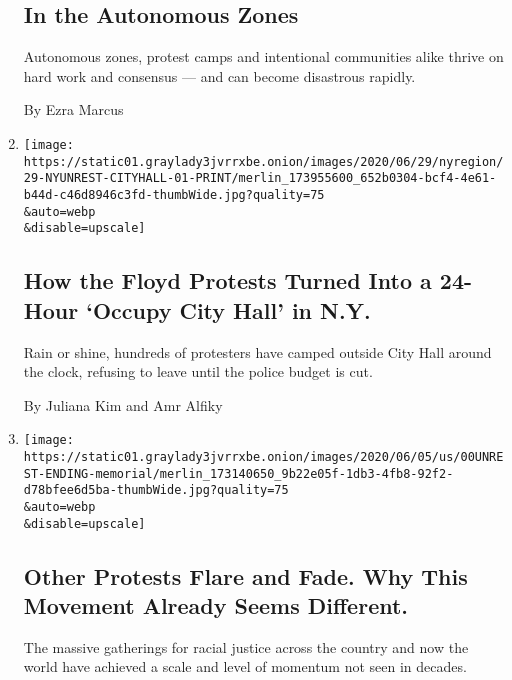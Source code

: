 \begin{enumerate}
  \hypertarget{in-the-autonomous-zones}{%
  \subsection{In the Autonomous Zones}\label{in-the-autonomous-zones}}

  Autonomous zones, protest camps and intentional communities alike
  thrive on hard work and consensus --- and can become disastrous
  rapidly.

  By Ezra Marcus
\item
  \href{/2020/06/28/nyregion/occupy-city-hall-nyc.html}{}

  \texttt{[image: https://static01.graylady3jvrrxbe.onion/images/2020/06/29/nyregion/29-NYUNREST-CITYHALL-01-PRINT/merlin\_173955600\_652b0304-bcf4-4e61-b44d-c46d8946c3fd-thumbWide.jpg?quality=75\\\&auto=webp\\\&disable=upscale]}

  \hypertarget{how-the-floyd-protests-turned-into-a-24-hour-occupy-city-hall-in-ny}{%
  \subsection{How the Floyd Protests Turned Into a 24-Hour `Occupy City
  Hall' in
  N.Y.}\label{how-the-floyd-protests-turned-into-a-24-hour-occupy-city-hall-in-ny}}

  Rain or shine, hundreds of protesters have camped outside City Hall
  around the clock, refusing to leave until the police budget is cut.

  By Juliana Kim and Amr Alfiky
\item
  \href{/2020/06/07/us/unrest-protests-minneapolis-ending.html}{}

  \texttt{[image: https://static01.graylady3jvrrxbe.onion/images/2020/06/05/us/00UNREST-ENDING-memorial/merlin\_173140650\_9b22e05f-1db3-4fb8-92f2-d78bfee6d5ba-thumbWide.jpg?quality=75\\\&auto=webp\\\&disable=upscale]}

  \hypertarget{other-protests-flare-and-fade-why-this-movement-already-seems-different}{%
  \subsection{Other Protests Flare and Fade. Why This Movement Already
  Seems
  Different.}\label{other-protests-flare-and-fade-why-this-movement-already-seems-different}}

  The massive gatherings for racial justice across the country and now
  the world have achieved a scale and level of momentum not seen in
  decades.


\end{enumerate}
